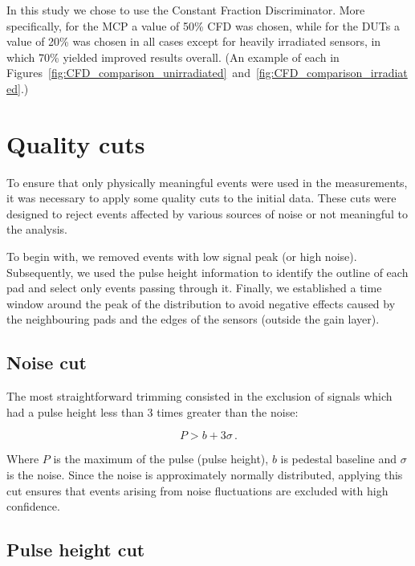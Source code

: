 In this study we chose to use the Constant Fraction Discriminator. More specifically, for the MCP a value of 50\% CFD was chosen, while for the DUTs a value of 20\% was chosen in all cases except for heavily irradiated sensors, in which 70\% yielded improved results overall. (An example of each in Figures~\ref{fig:CFD_comparison_unirradiated}~and~\ref{fig:CFD_comparison_irradiated}.)

\FloatBarrier

\section{Quality cuts}\label{sec:qualtiy_cuts}

To ensure that only physically meaningful events were used in the measurements, it was necessary to apply some quality cuts to the initial data. These cuts were designed to reject events affected by various sources of noise or not meaningful to the analysis. 

To begin with, we removed events with low signal peak (or high noise). Subsequently, we used the pulse height information to identify the outline of each pad and select only events passing through it. Finally, we established a time window around the peak of the distribution to avoid negative effects caused by the neighbouring pads and the edges of the sensors (outside the gain layer).

\subsection{Noise cut}\label{subsec:noise_cut}
The most straightforward trimming consisted in the exclusion of signals which had a pulse height less than 3 times greater than the noise:

\begin{equation*}
    P > b + 3\sigma \, .
\end{equation*}

Where \(P\) is the maximum of the pulse (pulse height), \(b\) is pedestal baseline and \(\sigma\) is the noise. Since the noise is approximately normally distributed, applying this cut ensures that events arising from noise fluctuations are excluded with high confidence.

\subsection{Pulse height cut}\label{subsec:pulseHeight_cut}

